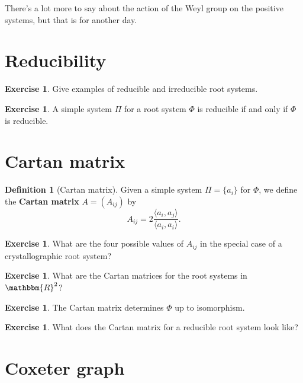 \documentclass[12pt]{article}
\theoremstyle{remark}
\theoremstyle{definition}
\newtheorem{defn}[thm]{Definition}
\newtheorem{exercise}[thm]{Exercise}
\newcommand{\defnword}[1]{\textbf{#1}}
\newcommand{\R}{\mathbbm{R}}
\begin{document}
There's a lot more to say about the action of the Weyl group on the
positive systems, but that is for another day.

\section{Reducibility}



\begin{exercise}
Give examples of reducible and irreducible root systems.
\end{exercise}

\begin{exercise}
A simple system $\Pi$ for a root system $\Phi$ is reducible if and
only if $\Phi$ is reducible.
\end{exercise}

\section{Cartan matrix}

\begin{defn}[Cartan matrix]
Given a simple system $\Pi = \{a_i\}$ for $\Phi$, we define
the \defnword{Cartan matrix} $A = (A_{ij})$ by
$$
A_{ij} = 2 \frac{\langle a_i, a_j \rangle}{\langle a_i, a_i \rangle}.
$$
\end{defn}

\begin{exercise}
What are the four possible values of $A_{ij}$ in the special case of a
crystallographic root system?
\end{exercise}

\begin{exercise}
What are the Cartan matrices for the root systems in $\R^2$?
\end{exercise}

\begin{exercise}
The Cartan matrix determines $\Phi$ up to isomorphism.
\end{exercise}

\begin{exercise}
What does the Cartan matrix for a reducible root system look like?
\end{exercise}


\section{Coxeter graph}
\end{document}
